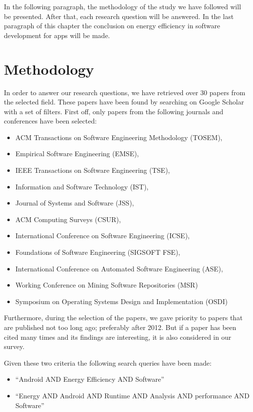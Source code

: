 \documentclass[]{book}
\providecommand{\tightlist}{%
  \setlength{\itemsep}{0pt}\setlength{\parskip}{0pt}}
\begin{document}
In the following paragraph, the methodology of the study we have
followed will be presented. After that, each research question will be
answered. In the last paragraph of this chapter the conclusion on energy
efficiency in software development for apps will be made.

\section{Methodology}\label{methodology}

In order to answer our research questions, we have retrieved over 30
papers from the selected field. These papers have been found by
searching on Google Scholar with a set of filters. First off, only
papers from the following journals and conferences have been selected:

\begin{itemize}
\tightlist
\item
  ACM Transactions on Software Engineering Methodology (TOSEM),
\item
  Empirical Software Engineering (EMSE),
\item
  IEEE Transactions on Software Engineering (TSE),
\item
  Information and Software Technology (IST),
\item
  Journal of Systems and Software (JSS),
\item
  ACM Computing Surveys (CSUR),
\item
  International Conference on Software Engineering (ICSE),
\item
  Foundations of Software Engineering (SIGSOFT FSE),
\item
  International Conference on Automated Software Engineering (ASE),
\item
  Working Conference on Mining Software Repositories (MSR)
\item
  Symposium on Operating Systems Design and Implementation (OSDI)
\end{itemize}

Furthermore, during the selection of the papers, we gave priority to
papers that are published not too long ago; preferably after 2012. But
if a paper has been cited many times and its findings are interesting,
it is also considered in our survey.

Given these two criteria the following search queries have been made:

\begin{itemize}
\tightlist
\item
  ``Android AND Energy Efficiency AND Software''
\item
  ``Energy AND Android AND Runtime AND Analysis AND performance AND
  Software''
\end{itemize}
\end{document}
